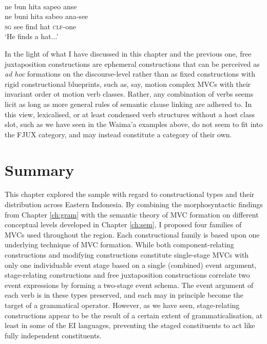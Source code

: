\ea 
{}\\
\glll ne bun hita sapeo anse \\
ne buni hita sabeo ana-see \\
\textsc{sg} see find hat \textsc{clf}-one \\
\glft `He finds a hat...' \\ 
\z

In the light of what I have discussed in this chapter and the previous one, free juxtaposition constructions are ephemeral constructions that can be perceived as \textit{ad hoc} formations on the discourse-level rather than as fixed constructions with rigid constructional blueprints, such as, say, motion complex MVCs with their invariant order ot motion verb classes. Rather, any combination of verbs seems licit as long as more general rules of semantic clause linking are adhered to. In this view, lexicalised, or at least condensed verb structures without a host class slot, such as we have seen in the Waima'a examples above, do not seem to fit into the FJUX category, and may instead constitute a category of their own.

\section{Summary}

This chapter explored the sample with regard to constructional types and their distribution across Eastern Indonesia. By combining the morphosyntactic findings from Chapter \ref{ch:gram} with the semantic theory of MVC formation on different conceptual levels developed in Chapter \ref{ch:sem}, I proposed four families of MVCs used throughout the region. Each constructional family is based upon one underlying technique of MVC formation. While both component-relating constructions and modifying constructions constitute single-stage MVCs with only one individuable event stage based on a single (combined) event argument, stage-relating constructions and free juxtaposition constructions correlate two event expressions by forming a two-stage event schema. The event argument of each verb is in these types preserved, and each may in principle become the target of a grammatical operator. However, as we have seen, stage-relating constructions appear to be the result of a certain extent of grammaticalisation, at least in some of the EI languages, preventing the staged constituents to act like fully independent constituents. 

